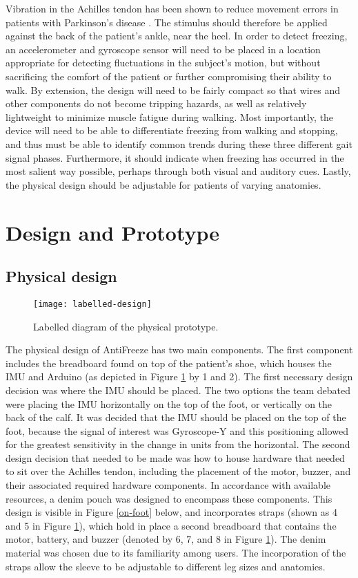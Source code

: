 \documentclass[titlepage]{article}
\begin{document}
\begin{doublespacing}
Vibration in the Achilles tendon has been shown to reduce movement errors in patients with Parkinson's disease \cite{almeida}. The stimulus should therefore be applied against the back of the patient's ankle, near the heel. In order to detect freezing, an accelerometer and gyroscope sensor will need to be placed in a location appropriate for detecting fluctuations in the subject's motion, but without sacrificing the comfort of the patient or further compromising their ability to walk. By extension, the design will need to be fairly compact so that wires and other components do not become tripping hazards, as well as relatively lightweight to minimize muscle fatigue during walking. Most importantly, the device will need to be able to differentiate freezing from walking and stopping, and thus must be able to identify common trends during these three different gait signal phases. Furthermore, it should indicate when freezing has occurred in the most salient way possible, perhaps through both visual and auditory cues. Lastly, the physical design should be adjustable for patients of varying anatomies.

\clearpage
\section{Design and Prototype}
\subsection{Physical design}

\begin{figure}[H]
	\texttt{[image: labelled-design]}
	\caption{Labelled diagram of the physical prototype.}
	\label{labelled}
\end{figure}

The physical design of AntiFreeze has two main components. The first component includes the breadboard found on top of the patient's shoe, which houses the IMU and Arduino (as depicted in Figure \ref{labelled} by 1 and 2). The first necessary design decision was where the IMU should be placed. The two options the team debated were placing the IMU horizontally on the top of the foot, or vertically on the back of the calf. It was decided that the IMU should be placed on the top of the foot, because the signal of interest was Gyroscope-Y and this positioning allowed for the greatest sensitivity in the change in units from the horizontal. The second design decision that needed to be made was how to house hardware that needed to sit over the Achilles tendon, including the placement of the motor, buzzer, and their associated required hardware components. In accordance with available resources, a denim pouch was designed to encompass these components. This design is visible in Figure \ref{on-foot} below, and incorporates straps (shown as 4 and 5 in Figure \ref{labelled}), which hold in place a second breadboard that contains the motor, battery, and buzzer (denoted by 6, 7, and 8 in Figure \ref{labelled}). The denim material was chosen due to its familiarity among users. The incorporation of the straps allow the sleeve to be adjustable to different leg sizes and anatomies.


\end{doublespacing}
\end{document}
